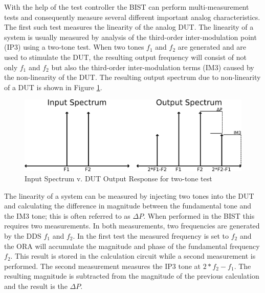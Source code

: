 \documentclass[12pt]{report}
\begin{document}
With the help of the test controller the BIST can perform multi-measurement tests and consequently measure several different important analog characteristics. The first such test measures the linearity of the analog DUT.  The linearity of a system is usually measured by analysis of the third-order inter-modulation point (IP3) using a two-tone test\cite{basessa}.  When two tones $f_1$ and $f_2$ are generated and are used to stimulate the DUT, the resulting output frequency will consist of not only $f_1$ and $f_2$ but also the third-order inter-modulation terms (IM3) caused by the non-linearity of the DUT.  The resulting output spectrum due to non-linearity of a DUT is shown in Figure \ref{fig:linearityspectrum}.  
\begin{figure}
  \begin{center}
    \includegraphics[scale=1]{images/linearity-spectrum}
  \end{center}
  \caption{Input Spectrum v. DUT Output Response for two-tone test}
  \label{fig:linearityspectrum}
\end{figure}
The linearity of a system can be measured by injecting two tones into the DUT and calculating the difference in magnitude between the fundamental tone and the IM3 tone; this is often referred to as $\Delta P$\cite{basessa}.  When performed in the BIST this requires two measurements.  In both measurements, two frequencies are generated by the DDS $f_1$ and $f_2$.  In the first test the measured frequency is set to $f_2$ and the ORA will accumulate the magnitude and phase of the fundamental frequency $f_2$.  This result is stored in the calculation circuit while a second measurement is performed.  The second measurement measures the IP3 tone at $2*f_2-f_1$\cite{testtime}\cite{jie}.  The resulting magnitude is subtracted from the magnitude of the previous calculation and the result is the $\Delta P$.
\end{document}
